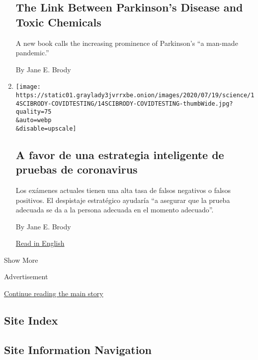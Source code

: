 \begin{enumerate}
  \hypertarget{the-link-between-parkinsons-disease-and-toxic-chemicals}{%
  \subsection{The Link Between Parkinson's Disease and Toxic
  Chemicals}\label{the-link-between-parkinsons-disease-and-toxic-chemicals}}

  A new book calls the increasing prominence of Parkinson's ``a man-made
  pandemic.''

  By Jane E. Brody
\item
  \href{/es/2020/07/15/espanol/ciencia-y-tecnologia/coronavirus-pruebas-inteligentes-testeo.html}{}

  \texttt{[image: https://static01.graylady3jvrrxbe.onion/images/2020/07/19/science/14SCIBRODY-COVIDTESTING/14SCIBRODY-COVIDTESTING-thumbWide.jpg?quality=75\\\&auto=webp\\\&disable=upscale]}

  \hypertarget{a-favor-de-una-estrategia-inteligente-de-pruebas-de-coronavirus}{%
  \subsection{A favor de una estrategia inteligente de pruebas de
  coronavirus}\label{a-favor-de-una-estrategia-inteligente-de-pruebas-de-coronavirus}}

  Los exámenes actuales tienen una alta tasa de falsos negativos o
  falsos positivos. El despistaje estratégico ayudaría ``a asegurar que
  la prueba adecuada se da a la persona adecuada en el momento
  adecuado''.

  By Jane E. Brody

  \href{https://www.nytimes3xbfgragh.onion/2020/07/13/well/live/coronavirus-smart-testing.html}{Read
  in English}
\end{enumerate}

Show More

Advertisement

\protect\hyperlink{after-mid2}{Continue reading the main story}

\hypertarget{site-index}{%
\subsection{Site Index}\label{site-index}}

\hypertarget{site-information-navigation}{%
\subsection{Site Information
Navigation}\label{site-information-navigation}}

